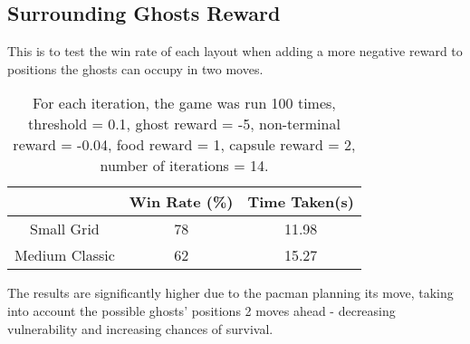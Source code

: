 \documentclass[12pt]{report}
\begin{document}
      \subsection*{Surrounding Ghosts Reward}
      This is to test the win rate of each layout when adding a more negative reward to positions the ghosts can occupy in two moves.
        \begin{table}[H]
          \begin{center}
            \begin{adjustbox}{max width=\textwidth}
            \begin{tabular}{*{3}{c}}
              \textbf{} & \textbf{Win Rate (\%)} & \textbf{Time Taken(s)} \\
              \hline
                    Small Grid & 78 & 11.98 \\
                    Medium Classic & 62 & 15.27 \\

            \end{tabular}
            \end{adjustbox}
            \caption{For each iteration, the game was run 100 times, threshold = 0.1, ghost reward = -5, non-terminal reward = -0.04, food reward = 1, capsule reward = 2, number of iterations = 14.}
            \label{tab:table4}
          \end{center}
        \end{table}
        \vspace{-9mm}
        The results are significantly higher due to the pacman planning its move, taking into account the possible ghosts' positions 2 moves ahead - decreasing vulnerability and increasing chances of survival.
\end{document}
